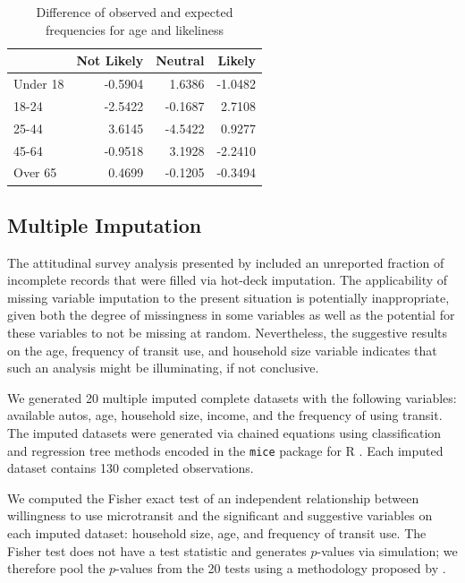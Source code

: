 \documentclass[smartcities,article,submit,moreauthors,pdftex]{mdpi}
\begin{document}
\begin{table}

\caption{\label{tab:age-difference}Difference of observed and expected frequencies for age and likeliness}
\centering
\begin{tabular}[t]{lrrr}
\toprule
  & Not Likely & Neutral & Likely\\
\midrule
Under 18 & -0.5904 & 1.6386 & -1.0482\\
18-24 & -2.5422 & -0.1687 & 2.7108\\
25-44 & 3.6145 & -4.5422 & 0.9277\\
45-64 & -0.9518 & 3.1928 & -2.2410\\
Over 65 & 0.4699 & -0.1205 & -0.3494\\
\bottomrule
\end{tabular}
\end{table}

\hypertarget{multiple-imputation}{%
\subsection{Multiple Imputation}\label{multiple-imputation}}

The attitudinal survey analysis presented by \citet{KONIG2020954} included an
unreported fraction of incomplete records that were filled via hot-deck
imputation. The applicability of missing variable imputation to the present situation
is potentially inappropriate, given both the degree of missingness in some
variables as well as the potential for these variables to not be missing at
random. Nevertheless, the suggestive results on the age, frequency of transit
use, and household size variable indicates that such an analysis might be
illuminating, if not conclusive.

We generated 20 multiple imputed complete datasets with the
following variables: available autos, age, household size, income, and the
frequency of using transit. The imputed datasets were generated via chained
equations using classification and regression tree methods encoded in the \texttt{mice}
package for R \citep{mice2011, R-base}. Each imputed dataset contains 130 completed
observations.

We computed the Fisher exact test of an independent relationship
between willingness to use microtransit and the significant and suggestive
variables on each imputed dataset: household size, age, and frequency of transit
use. The Fisher test does not have a test statistic and generates \(p\)-values via
simulation; we therefore pool the \(p\)-values from the 20 tests
using a methodology proposed by \citet{LichtThesis}.
\end{document}
